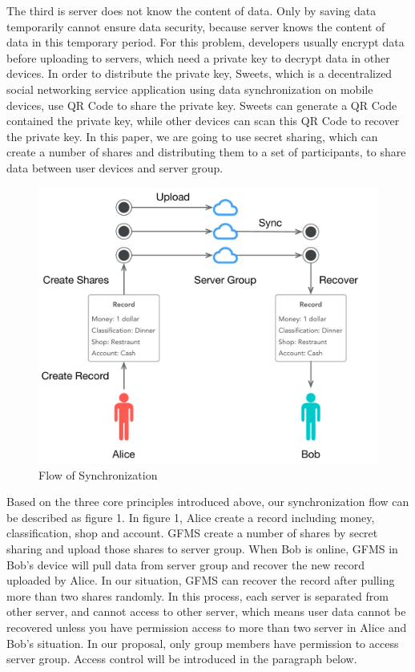 \documentclass[twocolumn,10pt]{article}
\begin{document}
The third is server does not know the content of data. Only by saving data temporarily cannot ensure data security, because server knows the content of data in this temporary period. For this problem, developers usually encrypt data before uploading to servers, which need a private key to decrypt data in other devices. In order to distribute the private key, Sweets, which is a decentralized social networking service application using data synchronization on mobile devices, use QR Code to share the private key. Sweets can generate a QR Code contained the private key, while other devices can scan this QR Code to recover the private key. In this paper, we are going to use secret sharing, which can create a number of shares and distributing them to a set of participants\cite{smith2013layered}, to share data between user devices and server group.

\begin{figure}[t]
\centering
\includegraphics[scale=0.4]{sync_flow}
\caption{Flow of Synchronization}
\end{figure}
Based on the three core principles introduced above, our synchronization flow can be described as figure 1. In figure 1, Alice create a record including money, classification, shop and account. GFMS create a number of shares by secret sharing and upload those shares to server group. When Bob is online, GFMS in Bob's device will pull data from server group and recover the new record uploaded by Alice. In our situation, GFMS can recover the record after pulling more than two shares randomly. In this process, each server is separated from other server, and cannot access to other server, which means user data cannot be recovered unless you have permission access to more than two server in Alice and Bob's situation. In our proposal, only group members have permission to access server group. Access control will be introduced in the paragraph below.
\end{document}
